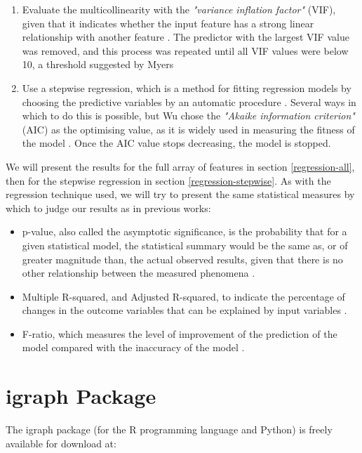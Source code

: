 \documentclass[bsc,frontabs,twoside,singlespacing,parskip,deptreport]{infthesis}
\begin{document}
\begin{enumerate}
	\item Evaluate the multicollinearity with the \textit{"variance inflation factor"} (VIF), given that it indicates whether the input feature has a strong linear relationship with another feature \cite{fox}. The predictor with the largest VIF value was removed, and this process was repeated until all VIF values were below 10, a threshold suggested by Myers \cite{myers}
	\item Use a stepwise regression, which is a method for fitting regression models by choosing the predictive variables by an automatic procedure \cite{ralston1960mathematical}. Several ways in which to do this is possible, but Wu \cite{masters} chose the \textit{"Akaike information criterion"} (AIC) as the optimising value, as it is widely used in measuring the fitness of the model \cite{akaike1998information}. Once the AIC value stops decreasing, the model is stopped.
\end{enumerate}

We will present the results for the full array of features in section \ref{regression-all}, then for the stepwise regression in section \ref{regression-stepwise}. As with the regression technique used, we will try to present the same statistical measures by which to judge our results as in previous works:

\begin{itemize}
	\item p-value, also called the asymptotic significance, is the probability that for a given statistical model, the statistical summary would be the same as, or of greater magnitude than, the actual observed results, given that there is no other relationship between the measured phenomena \cite{wasserstein2016asa}.
	\item Multiple R-squared, and Adjusted R-squared, to indicate the percentage of changes in the outcome variables that can be explained by input variables \cite{masters}.
	\item F-ratio, which measures the level of improvement of the prediction of the model compared with the inaccuracy of the model \cite{FieldAndyP2012DsuR}.
\end{itemize}

\section{igraph Package}\label{igraph}
The igraph package (for the R programming language and Python) is freely available for download at: 
\end{document}
